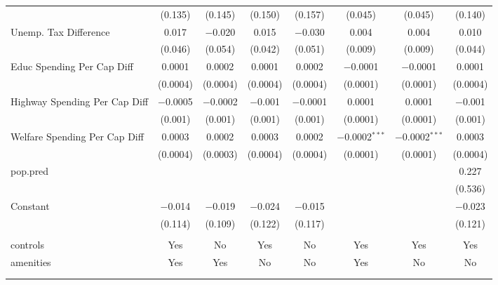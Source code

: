 \begin{table}[!htbp]
\begin{tabular}{@{\extracolsep{5pt}}lccccccc}
  & (0.135) & (0.145) & (0.150) & (0.157) & (0.045) & (0.045) & (0.140) \\ 
  Unemp. Tax Difference & 0.017 & $-$0.020 & 0.015 & $-$0.030 & 0.004 & 0.004 & 0.010 \\ 
  & (0.046) & (0.054) & (0.042) & (0.051) & (0.009) & (0.009) & (0.044) \\ 
  Educ Spending Per Cap Diff & 0.0001 & 0.0002 & 0.0001 & 0.0002 & $-$0.0001 & $-$0.0001 & 0.0001 \\ 
  & (0.0004) & (0.0004) & (0.0004) & (0.0004) & (0.0001) & (0.0001) & (0.0004) \\ 
  Highway Spending Per Cap Diff & $-$0.0005 & $-$0.0002 & $-$0.001 & $-$0.0001 & 0.0001 & 0.0001 & $-$0.001 \\ 
  & (0.001) & (0.001) & (0.001) & (0.001) & (0.0001) & (0.0001) & (0.001) \\ 
  Welfare Spending Per Cap Diff & 0.0003 & 0.0002 & 0.0003 & 0.0002 & $-$0.0002$^{***}$ & $-$0.0002$^{***}$ & 0.0003 \\ 
  & (0.0004) & (0.0003) & (0.0004) & (0.0004) & (0.0001) & (0.0001) & (0.0004) \\ 
  pop.pred &  &  &  &  &  &  & 0.227 \\ 
  &  &  &  &  &  &  & (0.536) \\ 
  Constant & $-$0.014 & $-$0.019 & $-$0.024 & $-$0.015 &  &  & $-$0.023 \\ 
  & (0.114) & (0.109) & (0.122) & (0.117) &  &  & (0.121) \\ 
 \hline \\[-1.8ex] 
controls & Yes & No & Yes & No & Yes & Yes & Yes \\ 
amenities & Yes & Yes & No & No & Yes & No & No \\ 
\hline \\[-1.8ex] 
\hline 
\hline \\[-1.8ex] 
\end{tabular} 
\end{table} 
